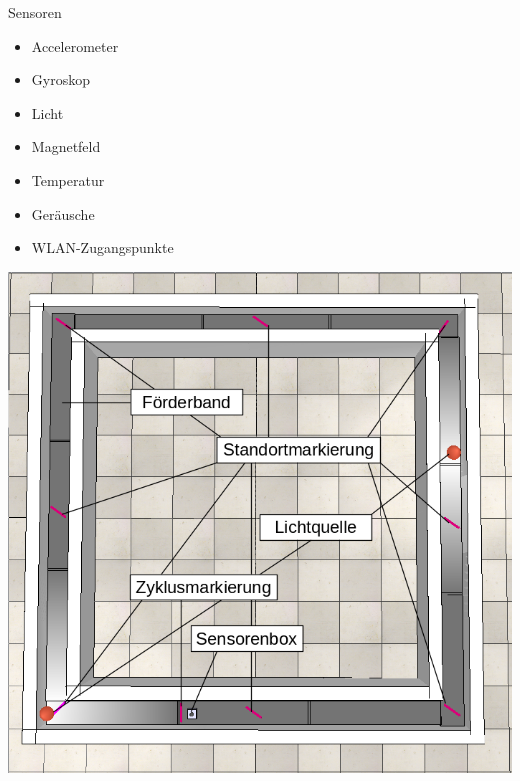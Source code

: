 \documentclass[10pt]{beamer}
\begin{document}
\begin{frame}{Sensoren}
\begin{minipage}{.5\textwidth}
    \begin{itemize}
        \item Accelerometer
        \item Gyroskop
        \item Licht
        \color{red}
        \item Magnetfeld
        \item Temperatur
        \item Geräusche
        \item WLAN-Zugangspunkte
    \end{itemize}
\end{minipage}%
\begin{minipage}{.5\textwidth}
    \centering
    \includegraphics[width=\linewidth]{model/simple_square_labeled.png} 
\end{minipage}
\end{frame}
\end{document}
